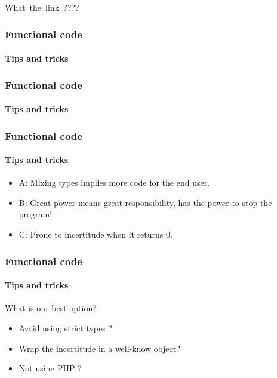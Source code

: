 \begin{frame}
    What\pause\ the\pause\ link\pause\ ????
\end{frame}

\begin{frame}
    \frametitle{Functional code}
    \framesubtitle{Tips and tricks}

    
    \pause
    
\end{frame}

\begin{frame}
    \frametitle{Functional code}
    \framesubtitle{Tips and tricks}

    
    \pause
    
    \pause
    
\end{frame}

\begin{frame}
    \frametitle{Functional code}
    \framesubtitle{Tips and tricks}

    \begin{itemize}[<+->]
        \item A: Mixing types implies more code for the end user.
        \item B: Great power means great responsibility, has the power to stop the program!
        \item C: Prone to incertitude when it returns 0.
    \end{itemize}
\end{frame}

\begin{frame}
    \frametitle{Functional code}
    \framesubtitle{Tips and tricks}

    What is our best option?

    \pause

    \begin{itemize}[<+->]
        \item Avoid using strict types ?
        \item Wrap the incertitude in a well-know object?
        \item Not using PHP ?
    \end{itemize}
\end{frame}


